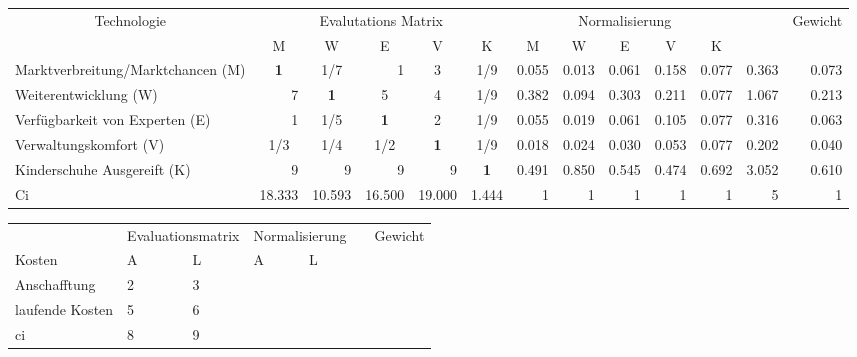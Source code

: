 \begin{table}[htbp]
\tiny
\caption{}
\begin{longtable}{|l|c|c|c|c|c|c|c|c|c|c|r|r|}
\hline
\multicolumn{ 1}{|c|}{Technologie} & \multicolumn{ 5}{c|}{Evalutations Matrix} & \multicolumn{ 5}{c|}{Normalisierung} & \multicolumn{1}{l|}{} & \multicolumn{1}{l|}{Gewicht} \\ \cline{ 2- 13}
\multicolumn{ 1}{|c|}{} & M & W & E & V & K & M & W & E & V & K & \multicolumn{1}{l|}{} & \multicolumn{1}{l|}{} \\ \hline
Marktverbreitung/Marktchancen (M) & \textbf{1    } &  1/7 & \multicolumn{1}{r|}{1    } & 3 &  1/9 & 0.055 & 0.013 & 0.061 & 0.158 & 0.077 & 0.363 & 0.073 \\ \hline
Weiterentwicklung (W) & \multicolumn{1}{r|}{7    } & \textbf{1} & 5     & 4 &  1/9 & 0.382 & 0.094 & 0.303 & 0.211 & 0.077 & 1.067 & 0.213 \\ \hline
Verfügbarkeit von Experten (E) & \multicolumn{1}{r|}{1    } &  1/5 & \textbf{1} & 2 &  1/9 & 0.055 & 0.019 & 0.061 & 0.105 & 0.077 & 0.316 & 0.063 \\ \hline
Verwaltungskomfort (V) &  1/3 &  1/4 &  1/2 & \textbf{1} &  1/9 & 0.018 & 0.024 & 0.030 & 0.053 & 0.077 & 0.202 & 0.040 \\ \hline
Kinderschuhe Ausgereift (K) & \multicolumn{1}{r|}{9    } & \multicolumn{1}{r|}{9    } & \multicolumn{1}{r|}{9    } & \multicolumn{1}{r|}{9    } & \textbf{1} & 0.491 & 0.850 & 0.545 & 0.474 & 0.692 & 3.052 & 0.610 \\ \hline
Ci & 18.333 & 10.593 & 16.500 & 19.000 & 1.444 & \multicolumn{1}{r|}{1} & \multicolumn{1}{r|}{1} & \multicolumn{1}{r|}{1} & \multicolumn{1}{r|}{1} & \multicolumn{1}{r|}{1} & 5 & 1 \\ \hline
\end{longtable}
\label{}
\end{table}



\begin{center}
  \begin{tabular}{ | l | l | l | l | l | l | l | }
   \hline
    \cellcolor{gray}& \multicolumn{2}{|c|}{\cellcolor{gray}\color{white}Evaluationsmatrix} & \multicolumn{2}{|c|}{\cellcolor{gray}\color{white}Normalisierung} & \cellcolor{gray}& \cellcolor{gray}Gewicht\\  \cline{2-7}
   
    \multirow{-2}{*}{\cellcolor{gray}\color{white}Kosten}& \cellcolor{light-gray}A & \cellcolor{light-gray}L & \cellcolor{light-gray}A & \cellcolor{light-gray}L & \cellcolor{light-gray}& \cellcolor{light-gray}\\
    \hline
    \cellcolor{light-gray}Anschafftung & 2 & 3 &  &  &  & \\ \hline
    \cellcolor{light-gray}laufende Kosten & 5 & 6 &  & &  &\\ \hline  \hline
   \cellcolor{light-gray} ci & 8 & 9 & & & &\\
    \hline
    
  \end{tabular}
\end{center}

